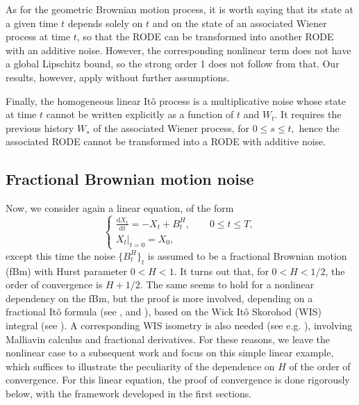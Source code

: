 \documentclass[reqno,12pt]{amsart}
\theoremstyle{plain} %
\theoremstyle{definition} %
\begin{document}
As for the geometric Brownian motion process, it is worth saying that its state at a given time $t$ depends solely on $t$ and on the state of an associated Wiener process at time $t$, so that the RODE can be transformed into another RODE with an additive noise. However, the corresponding nonlinear term does not have a global Lipschitz bound, so the strong order 1 does not follow from that. Our results, however, apply without further assumptions.

Finally, the homogeneous linear It\^o process is a multiplicative noise whose state at time $t$ cannot be written explicitly as a function of $t$ and $W_t.$ It requires the previous history $W_s$ of the associated Wiener process, for $0\leq s \leq t,$ hence the associated RODE cannot be transformed into a RODE with additive noise.

\subsection{Fractional Brownian motion noise}
\label{secfBmnoise}

Now, we consider again a linear equation, of the form
\begin{equation}
    \label{linearnonhomogeneousfbm}
    \begin{cases}
        \displaystyle \frac{\mathrm{d}X_t}{\mathrm{d} t} = -X_t + B^H_t, \qquad 0 \leq t \leq T, \\
        \left. X_t \right|_{t = 0} = X_0,
      \end{cases}
\end{equation}
except this time the noise $\{B^H_t\}_t$ is assumed to be a fractional Brownian motion (fBm) with Hurst parameter $0 < H < 1$. It turns out that, for $0 < H < 1/2$, the order of convergence is $H + 1/2$. The same seems to hold for a nonlinear dependency on the fBm, but the proof is more involved, depending on a fractional It\^o formula (see \cite[Theorem 4.2.6]{BHOB2008}, \cite[Theorem 4.1]{Bender2003}and \cite[Theorem 2.7.4]{Mishura2008}), based on the Wick It\^o Skorohod (WIS) integral (see \cite[Chapter 4]{BHOB2008}). A corresponding WIS isometry is also needed (see e.g. \cite[Theorem 4.5.6]{BHOB2008}), involving Malliavin calculus and fractional derivatives. For these reasons, we leave the nonlinear case to a subsequent work and focus on this simple linear example, which suffices to illustrate the peculiarity of the dependence on $H$ of the order of convergence. For this linear equation, the proof of convergence is done rigorously below, with the framework developed in the first sections.
\end{document}
